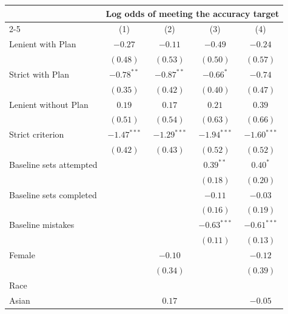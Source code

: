 \begin{tabular}{l c c c c}
\toprule
 & \multicolumn{4}{c}{Log odds of meeting the accuracy target} \\
\cmidrule(lr){2-5}
 & (1) & (2) & (3) & (4) \\
\midrule
Lenient with Plan        & $-0.27$       & $-0.11$       & $-0.49$       & $-0.24$       \\
                         & $(0.48)$      & $(0.53)$      & $(0.50)$      & $(0.57)$      \\
Strict with Plan         & $-0.78^{**}$  & $-0.87^{**}$  & $-0.66^{*}$   & $-0.74$       \\
                         & $(0.35)$      & $(0.42)$      & $(0.40)$      & $(0.47)$      \\
Lenient without Plan     & $0.19$        & $0.17$        & $0.21$        & $0.39$        \\
                         & $(0.51)$      & $(0.54)$      & $(0.63)$      & $(0.66)$      \\
Strict criterion         & $-1.47^{***}$ & $-1.29^{***}$ & $-1.94^{***}$ & $-1.60^{***}$ \\
                         & $(0.42)$      & $(0.43)$      & $(0.52)$      & $(0.52)$      \\
Baseline sets attempted  &               &               & $0.39^{**}$   & $0.40^{*}$    \\
                         &               &               & $(0.18)$      & $(0.20)$      \\
Baseline sets completed  &               &               & $-0.11$       & $-0.03$       \\
                         &               &               & $(0.16)$      & $(0.19)$      \\
Baseline mistakes        &               &               & $-0.63^{***}$ & $-0.61^{***}$ \\
                         &               &               & $(0.11)$      & $(0.13)$      \\
Female                   &               & $-0.10$       &               & $-0.12$       \\
                         &               & $(0.34)$      &               & $(0.39)$      \\
Race                     &               &               &               &               \\
\quad Asian              &               & $0.17$        &               & $-0.05$       \\

\end{tabular}

